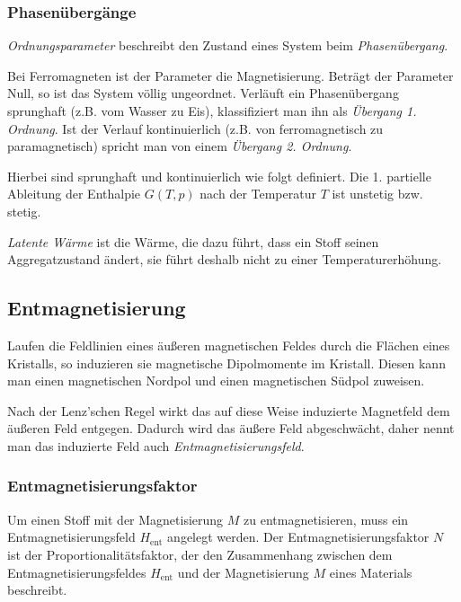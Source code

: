 \documentclass[12pt,a4paper]{scrartcl}
\numberwithin{equation}{section} %
\renewcommand{\[}{} %
\renewcommand{\]}{\noindent} %
\begin{document}
\hypertarget{phasenuxfcberguxe4nge}{%
\subsubsection{Phasenübergänge}\label{phasenuxfcberguxe4nge}}

\emph{Ordnungsparameter} beschreibt den Zustand eines System beim
\emph{Phasenübergang}.

Bei Ferromagneten ist der Parameter die Magnetisierung. Beträgt der
Parameter Null, so ist das System völlig ungeordnet. Verläuft ein
Phasenübergang sprunghaft (z.B. vom Wasser zu Eis), klassifiziert man
ihn als \emph{Übergang 1. Ordnung}. Ist der Verlauf kontinuierlich (z.B.
von ferromagnetisch zu paramagnetisch) spricht man von einem
\emph{Übergang 2. Ordnung}.

Hierbei sind sprunghaft und kontinuierlich wie folgt definiert. Die 1.
partielle Ableitung der Enthalpie \(G(T,p)\) nach der Temperatur \(T\)
ist unstetig bzw. stetig.

\emph{Latente Wärme} ist die Wärme, die dazu führt, dass ein Stoff
seinen Aggregatzustand ändert, sie führt deshalb nicht zu einer
Temperaturerhöhung.

\hypertarget{entmagnetisierung}{%
\subsection{Entmagnetisierung}\label{entmagnetisierung}}

Laufen die Feldlinien eines äußeren magnetischen Feldes durch die
Flächen eines Kristalls, so induzieren sie magnetische Dipolmomente im
Kristall. Diesen kann man einen magnetischen Nordpol und einen
magnetischen Südpol zuweisen.

Nach der Lenz'schen Regel wirkt das auf diese Weise induzierte
Magnetfeld dem äußeren Feld entgegen. Dadurch wird das äußere Feld
abgeschwächt, daher nennt man das induzierte Feld auch
\emph{Entmagnetisierungsfeld}.

\hypertarget{entmagnetisierungsfaktor}{%
\subsubsection{Entmagnetisierungsfaktor}\label{entmagnetisierungsfaktor}}

Um einen Stoff mit der Magnetisierung \(M\) zu entmagnetisieren, muss
ein Entmagnetisierungsfeld \(H_\mathrm{ent}\) angelegt werden. Der
Entmagnetisierungsfaktor \(N\) ist der Proportionalitätsfaktor, der den
Zusammenhang zwischen dem Entmagnetisierungsfeldes \(H_\mathrm{ent}\)
und der Magnetisierung \(M\) eines Materials beschreibt.
\end{document}
